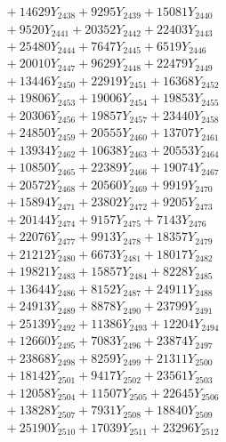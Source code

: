 \documentclass[a4paper,10pt]{article}
\begin{document}
{\begin{align}
&\;  + 14629 Y_{2438} + 9295 Y_{2439} + 15081 Y_{2440} \\[0.3ex]
&\;  + 9520 Y_{2441} + 20352 Y_{2442} + 22403 Y_{2443} \\[0.3ex]
&\;  + 25480 Y_{2444} + 7647 Y_{2445} + 6519 Y_{2446} \\[0.3ex]
&\;  + 20010 Y_{2447} + 9629 Y_{2448} + 22479 Y_{2449} \\[0.3ex]
&\;  + 13446 Y_{2450} + 22919 Y_{2451} + 16368 Y_{2452} \\[0.3ex]
&\;  + 19806 Y_{2453} + 19006 Y_{2454} + 19853 Y_{2455} \\[0.3ex]
&\;  + 20306 Y_{2456} + 19857 Y_{2457} + 23440 Y_{2458} \\[0.5ex]\allowbreak
&\;  + 24850 Y_{2459} + 20555 Y_{2460} + 13707 Y_{2461} \\[0.3ex]
&\;  + 13934 Y_{2462} + 10638 Y_{2463} + 20553 Y_{2464} \\[0.3ex]
&\;  + 10850 Y_{2465} + 22389 Y_{2466} + 19074 Y_{2467} \\[0.3ex]
&\;  + 20572 Y_{2468} + 20560 Y_{2469} + 9919 Y_{2470} \\[0.3ex]
&\;  + 15894 Y_{2471} + 23802 Y_{2472} + 9205 Y_{2473} \\[0.3ex]
&\;  + 20144 Y_{2474} + 9157 Y_{2475} + 7143 Y_{2476} \\[0.3ex]
&\;  + 22076 Y_{2477} + 9913 Y_{2478} + 18357 Y_{2479} \\[0.3ex]
&\;  + 21212 Y_{2480} + 6673 Y_{2481} + 18017 Y_{2482} \\[0.3ex]
&\;  + 19821 Y_{2483} + 15857 Y_{2484} + 8228 Y_{2485} \\[0.3ex]
&\;  + 13644 Y_{2486} + 8152 Y_{2487} + 24911 Y_{2488} \\[0.5ex]\allowbreak
&\;  + 24913 Y_{2489} + 8878 Y_{2490} + 23799 Y_{2491} \\[0.3ex]
&\;  + 25139 Y_{2492} + 11386 Y_{2493} + 12204 Y_{2494} \\[0.3ex]
&\;  + 12660 Y_{2495} + 7083 Y_{2496} + 23874 Y_{2497} \\[0.3ex]
&\;  + 23868 Y_{2498} + 8259 Y_{2499} + 21311 Y_{2500} \\[0.3ex]
&\;  + 18142 Y_{2501} + 9417 Y_{2502} + 23561 Y_{2503} \\[0.3ex]
&\;  + 12058 Y_{2504} + 11507 Y_{2505} + 22645 Y_{2506} \\[0.3ex]
&\;  + 13828 Y_{2507} + 7931 Y_{2508} + 18840 Y_{2509} \\[0.3ex]
&\;  + 25190 Y_{2510} + 17039 Y_{2511} + 23296 Y_{2512} \\[0.3ex]

\end{align}}
\end{document}
